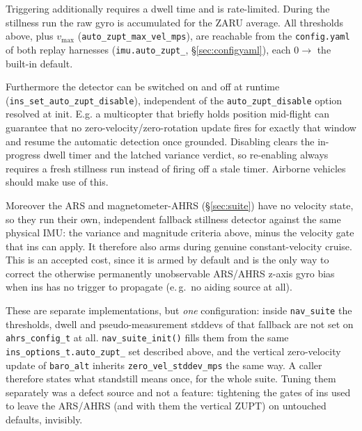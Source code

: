 \documentclass[11pt,a4paper]{article}
\newcommand{\code}[1]{\texttt{#1}}
\begin{document}
Triggering additionally requires a dwell time and is rate-limited.
During the stillness run the raw gyro is accumulated for the ZARU
average. All thresholds above, plus $v_{\max}$
(\code{auto\_\allowbreak{}zupt\_\allowbreak{}max\_\allowbreak{}vel\_\allowbreak{}mps}), are reachable from the
\code{config.yaml} of both replay harnesses (\code{imu.auto\_\allowbreak{}zupt\_\allowbreak*},
\S\ref{sec:configyaml}), each $0 \to$ the built-in default.

Furthermore the detector can be switched on and off at runtime
(\code{ins\_\allowbreak{}set\_\allowbreak{}auto\_\allowbreak{}zupt\_\allowbreak{}disable}), independent of the
\code{auto\_\allowbreak{}zupt\_\allowbreak{}disable} option resolved at init. E.g. a
multicopter that briefly holds position mid-flight can guarantee that no
zero-velocity/zero-rotation update fires for exactly that window and
resume the automatic detection once grounded. Disabling clears the
in-progress dwell timer and the latched variance verdict, so
re-enabling always requires a fresh stillness run instead of firing
off a stale timer. Airborne vehicles should make use of this.

Moreover the ARS and magnetometer-AHRS (\S\ref{sec:suite}) have no velocity
state, so they run their own, independent fallback stillness detector
against the same physical IMU: the variance and magnitude criteria
above, minus the velocity gate that ins can apply. It therefore also arms
during genuine constant-velocity cruise. This is an accepted cost, since it
is armed by default and is the only way to correct the otherwise
permanently unobservable ARS/AHRS z-axis gyro bias when ins has no
trigger to propagate (e.\,g.\ no aiding source at all).

These are separate implementations, but \emph{one} configuration: inside
\code{nav\_\allowbreak{}suite} the thresholds, dwell and pseudo-measurement stddevs
of that fallback are not set on \code{ahrs\_\allowbreak{}config\_\allowbreak{}t} at all.
\code{nav\_\allowbreak{}suite\_\allowbreak{}init()} fills them from the same
\code{ins\_\allowbreak{}options\_\allowbreak{}t.auto\_\allowbreak{}zupt\_\allowbreak*} set described above, and
the vertical zero-velocity update of \code{baro\_\allowbreak{}alt} inherits
\code{zero\_\allowbreak{}vel\_\allowbreak{}stddev\_\allowbreak{}mps} the same way. A caller therefore states
what standstill means once, for the whole suite. Tuning them
separately was a defect source and not a feature: tightening the gates of ins
used to leave the ARS/AHRS (and with them the vertical ZUPT)
on untouched defaults, invisibly.
\end{document}
